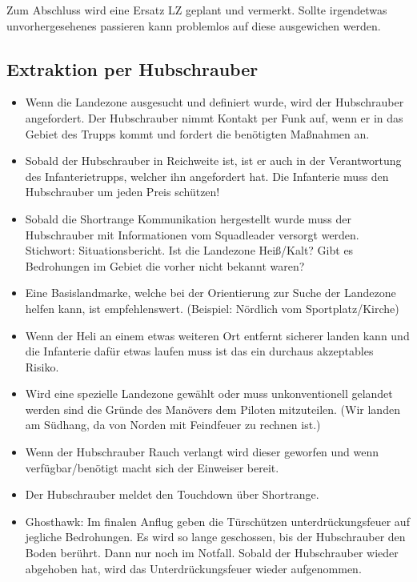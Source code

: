 	Zum Abschluss wird eine Ersatz \ac{LZ} geplant und vermerkt. Sollte irgendetwas unvorhergesehenes passieren kann problemlos auf diese ausgewichen werden.

\subsection{Extraktion per Hubschrauber}
 	\begin{itemize} 
		\item Wenn die Landezone ausgesucht und definiert wurde, wird der Hubschrauber angefordert. Der Hubschrauber nimmt Kontakt per Funk auf, wenn er in das Gebiet des Trupps kommt und fordert die benötigten Maßnahmen an.

		\item Sobald der Hubschrauber in Reichweite ist, ist er auch in der Verantwortung des Infanterietrupps, welcher ihn angefordert hat. Die Infanterie muss den Hubschrauber um jeden Preis schützen!

		\item Sobald die Shortrange Kommunikation hergestellt wurde muss der Hubschrauber mit Informationen vom Squadleader versorgt werden. Stichwort: Situationsbericht. Ist die Landezone Heiß/Kalt? Gibt es Bedrohungen im Gebiet die vorher nicht bekannt waren?

		\item Eine Basislandmarke, welche bei der Orientierung zur Suche der Landezone helfen kann, ist empfehlenswert. (Beispiel: Nördlich vom Sportplatz/Kirche)

		\item Wenn der Heli an einem etwas weiteren Ort entfernt sicherer landen kann und die Infanterie dafür etwas laufen muss ist das ein durchaus akzeptables Risiko.

		\item Wird eine spezielle Landezone gewählt oder muss unkonventionell gelandet werden sind die Gründe des Manövers dem Piloten mitzuteilen. (Wir landen am Südhang, da von Norden mit Feindfeuer zu rechnen ist.)

		\item Wenn der Hubschrauber Rauch verlangt wird dieser geworfen und wenn verfügbar/benötigt macht sich der Einweiser bereit.

		\item Der Hubschrauber meldet den Touchdown über Shortrange.

		\item Ghosthawk: Im finalen Anflug geben die Türschützen unterdrückungsfeuer auf jegliche Bedrohungen. Es wird so lange geschossen, bis der Hubschrauber den Boden berührt. Dann nur noch im Notfall. Sobald der Hubschrauber wieder abgehoben hat, wird das Unterdrückungsfeuer wieder aufgenommen.


\end{itemize}
